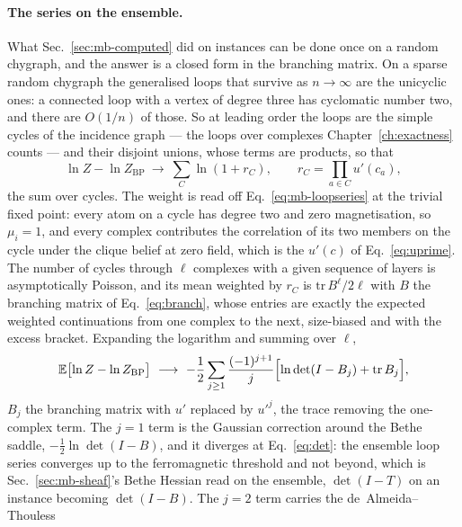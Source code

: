 \paragraph{The series on the ensemble.} What Sec.~\ref{sec:mb-computed}
did on instances can be done once on a random chygraph, and the answer
is a closed form in the branching matrix. On a sparse random chygraph
the generalised loops that survive as $n\to\infty$ are the unicyclic
ones: a connected loop with a vertex of degree three has cyclomatic
number two, and there are $O(1/n)$ of those. So at leading order the
loops are the simple cycles of the incidence graph --- the loops over
complexes Chapter~\ref{ch:exactness} counts --- and their disjoint
unions, whose terms are products, so that
\begin{equation}
  \ln Z-\ln Z_{\mathrm{BP}}\ \longrightarrow\ \sum_{C}\ln(1+r_{C}),
  \qquad
  r_{C}=\prod_{a\in C}u'(c_{a}),
  \label{eq:mb-cyclesum}
\end{equation}
the sum over cycles. The weight is read off Eq.~\eqref{eq:mb-loopseries}
at the trivial fixed point: every atom on a cycle has degree two and zero
magnetisation, so $\mu_{i}=1$, and every complex contributes the
correlation of its two members on the cycle under the clique belief at
zero field, which is the $u'(c)$ of Eq.~\eqref{eq:uprime}. The number of
cycles through $\ell$ complexes with a given sequence of layers is
asymptotically Poisson, and its mean weighted by $r_{C}$ is
$\mathrm{tr}\,B^{\ell}/2\ell$ with $B$ the branching matrix of
Eq.~\eqref{eq:branch}, whose entries are exactly the expected weighted
continuations from one complex to the next, size-biased and with the
excess bracket. Expanding the logarithm and summing over $\ell$,
\begin{equation}
  \mathbb{E}\bigl[\ln Z-\ln Z_{\mathrm{BP}}\bigr]
  \ \longrightarrow\
  -\frac12\sum_{j\ge1}\frac{(-1)^{j+1}}{j}
  \Bigl[\ln\det(I-B_{j})+\mathrm{tr}\,B_{j}\Bigr],
  \label{eq:mb-ensembleseries}
\end{equation}
$B_{j}$ the branching matrix with $u'$ replaced by $u'^{j}$, the trace
removing the one-complex term. The $j=1$ term is the Gaussian correction
around the Bethe saddle, $-\tfrac12\ln\det(I-B)$, and it diverges at
Eq.~\eqref{eq:det}: the ensemble loop series converges up to the
ferromagnetic threshold and not beyond, which is Sec.~\ref{sec:mb-sheaf}'s
Bethe Hessian read on the ensemble, $\det(I-T)$ on an instance
becoming $\det(I-B)$. The $j=2$ term carries the de~Almeida--Thouless
